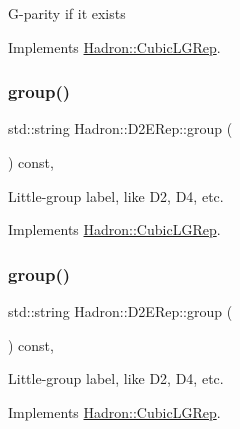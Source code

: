 G-\/parity if it exists 

Implements \mbox{\hyperlink{structHadron_1_1CubicLGRep_ace26f7b2d55e3a668a14cb9026da5231}{Hadron\+::\+Cubic\+L\+G\+Rep}}.

\mbox{\label{structHadron_1_1D2ERep_a7a2b734e04205943bbaa64c4b26147c9}} 
\subsubsection{\texorpdfstring{group()}{group()}\hspace{0.1cm}{\footnotesize\ttfamily [1/3]}}
{\footnotesize\ttfamily std\+::string Hadron\+::\+D2\+E\+Rep\+::group (\begin{DoxyParamCaption}{ }\end{DoxyParamCaption}) const\hspace{0.3cm}{\ttfamily [inline]}, {\ttfamily [virtual]}}

Little-\/group label, like D2, D4, etc. 

Implements \mbox{\hyperlink{structHadron_1_1CubicLGRep_a9bdb14b519a611d21379ed96a3a9eb41}{Hadron\+::\+Cubic\+L\+G\+Rep}}.

\mbox{\label{structHadron_1_1D2ERep_a7a2b734e04205943bbaa64c4b26147c9}} 
\subsubsection{\texorpdfstring{group()}{group()}\hspace{0.1cm}{\footnotesize\ttfamily [2/3]}}
{\footnotesize\ttfamily std\+::string Hadron\+::\+D2\+E\+Rep\+::group (\begin{DoxyParamCaption}{ }\end{DoxyParamCaption}) const\hspace{0.3cm}{\ttfamily [inline]}, {\ttfamily [virtual]}}

Little-\/group label, like D2, D4, etc. 

Implements \mbox{\hyperlink{structHadron_1_1CubicLGRep_a9bdb14b519a611d21379ed96a3a9eb41}{Hadron\+::\+Cubic\+L\+G\+Rep}}.

\mbox{\label{structHadron_1_1D2ERep_a7a2b734e04205943bbaa64c4b26147c9}} 
